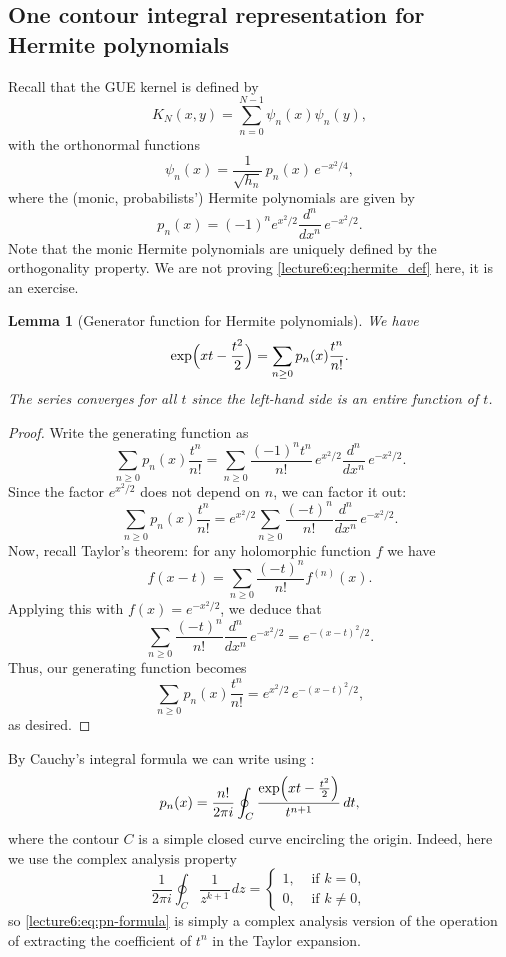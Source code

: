 \documentclass[letterpaper,11pt,oneside,reqno]{book}
\numberwithin{equation}{chapter}  %
\newcommand{\ssp}{\hspace{1pt}}
\newtheorem{lemma}[proposition]{Lemma}
\theoremstyle{definition}
\begin{document}
\subsection{One contour integral representation for Hermite polynomials}

Recall that the GUE kernel is defined by
\[
K_N(x,y)=\sum_{n=0}^{N-1}\psi_n(x)\psi_n(y),
\]
with the orthonormal functions
\[
\psi_n(x)=\frac{1}{\sqrt{h_n}}\,p_n(x)\,e^{-x^2/4},
\]
where the (monic, probabilists') Hermite polynomials are given by
\begin{equation}
\label{lecture6:eq:hermite_def}
	p_n(x)=(-1)^n e^{x^2/2}\frac{d^n}{dx^n}\,e^{-x^2/2}.
\end{equation}
Note that the monic Hermite polynomials are uniquely defined by the
orthogonality property. We are not proving \eqref{lecture6:eq:hermite_def} here,
it is an exercise.
\begin{lemma}[Generator function for Hermite polynomials]
	\label{lecture6:lem:hermite_gen}
	We have
	\[
		\exp\Bigl(xt-\frac{t^2}{2}\Bigr)=\sum_{n\ge0}p_n(x)\frac{t^n}{n!}.
	\]
	The series converges for all \(t\) since the left-hand side is an entire function of \(t\).
\end{lemma}
\begin{proof}
Write the generating function as
\[
	\sum_{n\ge0}p_n(x)\frac{t^n}{n!}
	=\sum_{n\ge0}\frac{(-1)^n t^n}{n!}\,e^{x^2/2}\frac{d^n}{dx^n}\,e^{-x^2/2}.
\]
Since the factor \(e^{x^2/2}\) does not depend on \(n\), we can factor it out:
\[
	\sum_{n\ge0}p_n(x)\frac{t^n}{n!}= e^{x^2/2}\sum_{n\ge0}\frac{(-t)^n}{n!}\frac{d^n}{dx^n}\,e^{-x^2/2}.
\]
Now, recall Taylor's theorem: for any holomorphic function \(f\) we have
\[
	f(x-t)=\sum_{n\ge0}\frac{(-t)^n}{n!}f^{(n)}(x).
\]
Applying this with \(f(x)=e^{-x^2/2}\), we deduce that
\[
	\sum_{n\ge0}\frac{(-t)^n}{n!}\frac{d^n}{dx^n}\,e^{-x^2/2}= e^{-(x-t)^2/2}.
\]
Thus, our generating function becomes
\[
	\sum_{n\ge0}p_n(x)\frac{t^n}{n!} = e^{x^2/2}\, e^{-(x-t)^2/2},
\]
as desired.
\end{proof}


By Cauchy's integral formula we can write using :
\begin{equation}
\label{lecture6:eq:pn-formula}
p_n(x)=\frac{n!}{2\pi i}\oint_C\frac{\exp\Bigl(xt-\frac{t^2}{2}\Bigr)}{t^{n+1}}\,dt,
\end{equation}
where the contour \(C\) is a simple closed curve encircling the origin.
Indeed, here we use the complex analysis property
\begin{equation*}
	\frac{1}{2\pi i}\oint_C \frac{1}{z^{k+1}}\ssp dz=\begin{cases}
		1,&\text{ if }k=0,\\
		0,&\text{ if }k\neq0,
	\end{cases}
\end{equation*}
so \eqref{lecture6:eq:pn-formula} is simply a complex analysis version of the
operation of extracting the coefficient of \(t^n\) in the Taylor expansion.
\end{document}
